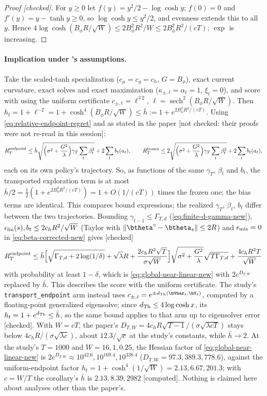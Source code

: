\begin{proof}[Proof {[checked]}]
For $y\ge0$ let $f(y)=y^2/2-\log\cosh y$; $f(0)=0$ and $f'(y)=y-\tanh y\ge0$,
so $\log\cosh y\le y^2/2$, and evenness extends this to all $y$. Hence
$4\log\cosh(B_\phi R/\sqrt W)\le2B_\phi^2R^2/W\le2B_\phi^2R^2/(cT)$; $\exp$ is
increasing.
\end{proof}

\paragraph{Implication under 's assumptions.}
Take the scaled-tanh specialization ($c_\mu=c_g=c_h$, $G=B_\phi$), exact current
curvature, exact solves and exact maximization ($\kappa_{\pm,t}=\alpha_t=1$,
$\xi_t=0$), and score with  using the uniform
certificate $c_{\pm,t}=\ell^{\mp2}$, $\ell=\operatorname{sech}^2(B_\phi R/\sqrt W)$.
Then $h_t=1+\ell^{-2}=1+\cosh^4(B_\phi R/\sqrt W)\le\bar h:=1+e^{2B_\phi^2R^2/(cT)}$.
Using \eqref{eq:relative-endpoint-regret} and
 as stated in the paper [not checked: their proofs
were not re-read in this session]:
\[
R_T^{\rm endpoint}\le\bar h\sqrt{\Big(\sigma^2+\frac{G^2}{\lambda}\Big)\gamma_T\sum_t\beta_t^2}+2\sum_tb_t(a_t),
\qquad
R_T^{\rm frozen}\le2\sqrt{\Big(\sigma^2+\frac{G^2}{\lambda}\Big)\gamma_T\sum_t\beta_t^2}+2\sum_tb_t(a_t),
\]
each on its own policy's trajectory. So, as functions of the same $\gamma_T$,
$\beta_t$ and $b_t$, the transported exploration term is at most
$\bar h/2=\frac12(1+e^{2B_\phi^2R^2/(cT)})=1+O(1/(cT))$ times the frozen one;
the bias terms are identical. This compares bound expressions; the realized
$\gamma_T$, $\beta_t$, $b_t$ differ between the two trajectories.
Bounding $\gamma_{t-1}\le\Gamma_{T,d}$ (\eqref{eq:finite-d-gamma-new}),
$\epsilon_{\rm lin}(s),b_t\le2c_hR^2/\sqrt W$ (Taylor with $\|\btheta^\circ-\btheta_s\|\le2R$)
and $\epsilon_{\rm mis}=0$ in \eqref{eq:beta-corrected-new} gives [checked]
\[
R_T^{\rm endpoint}\le\bar h\Big[\sqrt{\Gamma_{T,d}+2\log(1/\delta)}+\sqrt\lambda R
+\frac{2c_hR^2\sqrt T}{\sigma\sqrt W}\Big]\sqrt{\sigma^2+\frac{G^2}{\lambda}}\sqrt{T\Gamma_{T,d}}
+\frac{4c_hR^2T}{\sqrt W}
\]
with probability at least $1-\delta$, which is \eqref{eq:global-near-linear-new}
with $2e^{D_{T,W}}$ replaced by $\bar h$. This describes the score with the
uniform certificate. The study's \texttt{transport\_endpoint} arm instead uses
$c_{\pm,t}=e^{\pm d_{\rm Th}(\bVbar_t,\bV_t)}$, computed by a floating-point
generalized eigensolve; since $d_{\rm Th}\le4\log\cosh x$, its
$h_t=1+e^{d_{\rm Th}}\le\bar h$, so the same bound applies to that arm up to
eigensolver error [checked]. With $W=cT$, the paper's
$D_{T,W}=4c_hR\sqrt{T-1}/(\sigma\sqrt{\lambda cT})$ stays below
$4c_hR/(\sigma\sqrt{\lambda c})$, about $12.3/\sqrt c$ at the study's constants,
while $\bar h\to2$. At the study's $T=1000$ and $W=16,1,0.25$, the Hessian factor of
\eqref{eq:global-near-linear-new} is $2e^{D_{T,W}}\approx10^{42.6},10^{169.4},10^{338.4}$
($D_{T,W}=97.3,389.3,778.6$), against the uniform-endpoint factor
$h_t=1+\cosh^4(1/\sqrt W)=2.13,6.67,201.3$; with $c=W/T$ the corollary's
$\bar h$ is $2.13,8.39,2982$ [computed].
Nothing is claimed here about analyses other than the paper's.

